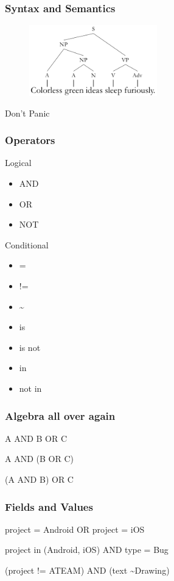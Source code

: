 \documentclass{beamer}
\begin{document}
\begin{frame}[fragile]
  \frametitle{Syntax and Semantics}

  \begin{figure}[p]
    \centering
    \includegraphics[width=15em]{sleep.png}
  \end{figure}

  \centering\huge{Don't Panic}\par

\end{frame}

\begin{frame}[fragile]
  \frametitle{Operators}

  Logical
  \begin{itemize}
  \item{AND}
  \item{OR}
  \item{NOT}
  \end{itemize}

  Conditional
  \begin{itemize}
  \item =
  \item !=
  \item \textasciitilde
  \item is
  \item is not
  \item in
  \item not in
  \end{itemize}

\end{frame}

\begin{frame}[fragile]
  \frametitle{Algebra all over again}

  \centering\huge{

  A AND B OR C

  A AND (B OR C)

  (A AND B) OR C

 }\par


\end{frame}

\begin{frame}[fragile]
  \frametitle{Fields and Values}
  
   \centering\large{

  project = Android OR project = iOS

  project in (Android, iOS) AND type = Bug

  (project != ATEAM) AND (text \textasciitilde \space Drawing)

 }\par

\end{frame}
\end{document}
